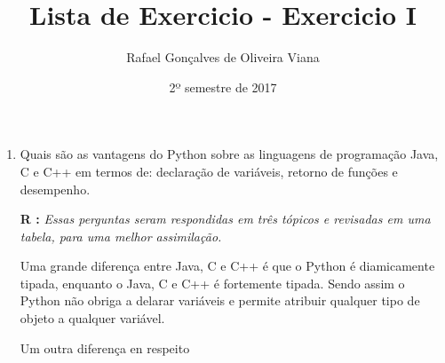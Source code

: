 \documentclass[12pt]{article}
\title{Lista de Exercicio  - Exercicio I }
\author{Rafael Gonçalves de  Oliveira Viana}
\date{2º semestre de 2017}
\begin{document}
\maketitle

\begin{enumerate}
\item
Quais são as vantagens do Python sobre as linguagens de programação Java, C e C++
em termos de: declaração de variáveis, retorno de funções e desempenho.


\textbf{R :}\textit{
	Essas perguntas seram respondidas em três tópicos e revisadas em uma tabela, para uma melhor assimilação.}
	
	 Uma grande diferença entre Java, C e C++ é que o Python é diamicamente tipada, enquanto o Java, C e C++ é fortemente tipada. Sendo assim o Python não obriga a delarar variáveis e permite atribuir qualquer tipo de objeto a qualquer variável.
	 
	 
	 Um outra diferença en respeito
	 
	 
	 
	 

\end{enumerate}
\end{document}
